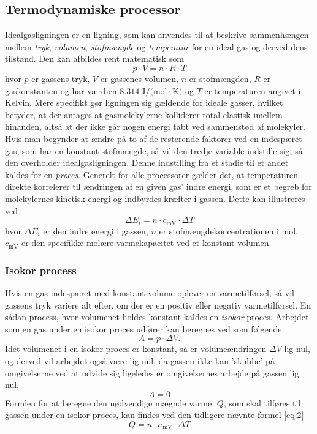 \documentclass[SRC.tex]{subfiles}
\begin{document}
	\subsection{Termodynamiske processor}
	Idealgasligningen er en ligning, som kan anvendes til at beskrive sammenhængen mellem
	\textit{tryk}, \textit{volumen}, \textit{stofmængde} og \textit{temperatur} for en ideal 
	gas og derved dens tilstand. Den kan afbildes rent matematisk som
	\begin{equation}
	p \cdot V = n \cdot R \cdot T
	\label{eq:idealgasligningen}
	\end{equation}
	hvor \(p\) er gassens tryk, \(V\) er gassenes volumen, \(n\) er stofmængden, \(R\) er gaskonstanten
	og har værdien \(\SI{8.314}{\joule\per (\mole\cdot\kelvin)} \) og \(T\) er temperaturen angivet i 
	Kelvin. Mere specifikt gør ligningen sig 
	gældende for ideale gasser, hvilket betyder, at der antages at gasmolekylerne kolliderer 
	total elastisk imellem hinanden, altså at der ikke går nogen energi tabt ved sammenstød af 
	molekyler. Hvis man begynder at ændre på to af de resterende faktorer ved en indespæret gas, 
	som har en konstant stofmængde, så vil den tredje variable indstille sig, så den overholder
	idealgasligningen. Denne indstilling fra et stadie til et andet kaldes for en \textit{proces}. 
	Generelt for alle processorer gælder det, at temperaturen direkte korrelerer til ændringen af 
	en given gas' indre energi, som er et begreb for molekylernes kinetisk energi og indbyrdes 
	kræfter i gassen. Dette kan illustreres ved
	\begin{equation}
	\Delta E_i = n \cdot c_{\text{mV}} \cdot \Delta T
	\label{eq:2}
	\end{equation}
	hvor \(\Delta E_i\) er den indre energi i gassen, \(n\) er stofmængdekoncentrationen i mol, 
	\(c_{\text{mV}}\) er den specifikke molære varmekapacitet ved et konstant volumen. 
	
	\subsubsection{Isokor process} 
	Hvis en gas indespæret med konstant volume oplever en varmetilførsel, så vil 
	gassens tryk variere alt efter, om der er en positiv eller negativ varmetilførsel. En sådan
	process, hvor volumenet holdes konstant kaldes en \textit{isokor} proces. Arbejdet som en 
	gas under en isokor proces udfører kan beregnes ved som følgende  
	\begin{equation}
	A = p \cdot \Delta V.
	\label{eq:3}
	\end{equation}
	Idet volumenet i en isokor proces er konstant, så er volumeændringen \(\Delta V\) lig nul, og derved vil arbejdet
	også være lig nul, da gassen ikke kan 'skubbe' på omgivelserne ved at udvide sig ligeledes er 
	omgivelsernes arbejde på gassen lig nul.
	\begin{equation}
	A = 0
	\end{equation}
	Formlen for at beregne den nødvendige mægnde varme, \(Q\), som skal tilføres til gassen under 
	en isokor proces, kan findes ved den tidligere nævnte formel \eqref{eq:2}
	\begin{equation}
	Q = n \cdot n_{\text{mV}} \cdot \Delta T
	\end{equation}
	
\end{document}
